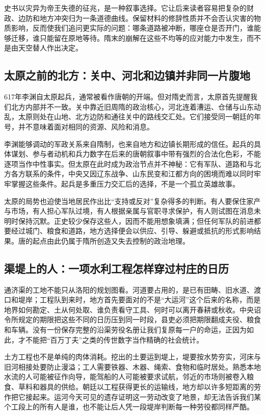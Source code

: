 史书以灾异为帝王失德的征兆，是一种叙事选择。它让后来读者容易把复杂的财政、边防和地方冲突归为一条道德曲线。保留材料的修辞性质并不会否认灾害的物质影响，反而使我们追问更实际的问题：哪条道路被冲断，哪座仓是否开门，谁能够迁移，谁只能留在原地等待。隋末的崩解在这些不均等的应对能力中发生，而不是由天空替人作出决定。

\subsection{太原之前的北方：关中、河北和边镇并非同一片腹地}
617年李渊自太原起兵，通常被看作唐朝的开端。但对隋史而言，太原首先提醒我们北方内部并不一致。关中靠近旧周隋的政治核心，河北连着漕运、仓储与山东动乱，太原则处在山地、北方边防和通往关中的路线交汇处。它们接受同一朝廷的年号，并不意味着面对相同的资源、风险和消息。

李渊能够调动的军政关系来自隋制，也来自地方和边镇长期形成的信任。起兵的具体谋划、参与者动机和兵力数字在后来的唐朝叙事中带有强烈的合法化色彩，不能逐项当作中性事实。但太原在此时成为政治节点并不神秘：它有军队、道路和与北方各方联系的条件，中央又因辽东战争、山东民变和江都方向的困境而难以同时牢牢掌握这些条件。起兵是多重压力交汇后的选择，不是一个孤立英雄故事。

太原的局势也迫使当地居民作出比“支持或反对”复杂得多的判断。有人要保住家产与市场，有人担心军队过境，有人根据亲属与官职寻求保护，有人则试图在消息未明时保持沉默。正史较少保存这些人，因而不能用想象填满；但任何军队的前进都要经过城门、粮食和道路，地方选择便会以供应、引导、躲避或抵抗的形式影响结果。唐的起点由此仍属于隋所创造又失去控制的政治地理。

\subsection{渠堤上的人：一项水利工程怎样穿过村庄的日历}
通济渠的工地不能只从洛阳的规划图看。河道要占用的，是已有田畴、旧水道、渡口和堤岸；工程队到来时，地方首先要面对的不是“大运河”这个后来的名称，而是地界如何勘定、土从何处取、谁负责看守工具、何时可以离开春耕或秋收。中央诏令所规定的期限把这些不同的日历压到同一时段，县吏必须把期限翻成夫役、粮食和车辆。没有一份保存完整的沿渠劳役名册让我们复原每一户的命运，正因为如此，才不能把“百万丁夫”之类的传世数字当作精确的社会统计。

土方工程也不是单纯的肉体消耗。挖出的土要运到堤上，堤要按水势夯实，河床与旧河相接处要防止漫溢；工人需要铁器、木器、绳索、食物和临时居处。熟悉本地水流的人可能被征作向导，能驾船的人可能被要求试航，邻近的市场则被卷入粮食、草料和器具的供给。朝廷以工程获得更长的运输线，地方却以许多短距离的劳作把它接起来。运河今天可见的遗存证明这一劳动改变了地景，却无法告诉我们某个工段上的所有人是谁，也不能让后人凭一段堤岸判断每一种劳役都同样严酷。

